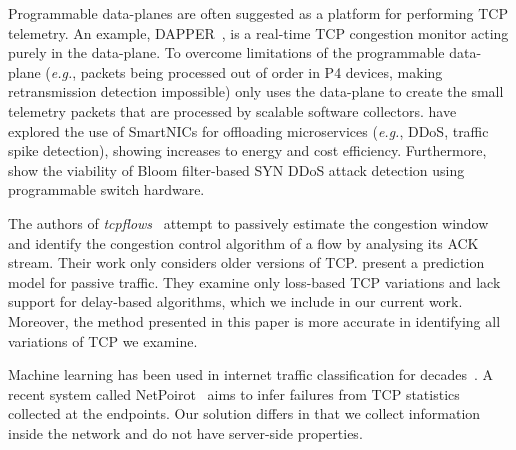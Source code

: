 
Programmable data-planes are often suggested as a platform for performing TCP telemetry. An example, DAPPER~\cite{DBLP:conf/sosr/GhasemiBR17}, is a real-time TCP congestion monitor acting purely in the data-plane. To overcome limitations of the programmable data-plane (\emph{e.g.}, packets being processed out of order in P4 devices, making retransmission detection impossible) \seidr{} only uses the data-plane to create the small telemetry packets that are processed by scalable software collectors.
\Textcite{DBLP:conf/usenix/LiuPKP19} have explored the use of SmartNICs for offloading microservices (\emph{e.g.}, DDoS, traffic spike detection), showing increases to energy and cost efficiency.
Furthermore, \textcite{DBLP:conf/sc/HillAG18} show the viability of Bloom filter-based SYN DDoS attack detection using programmable switch hardware.

The authors of \emph{tcpflows}~\cite{rewaskar2006passive} attempt to passively estimate the congestion window and identify the congestion control algorithm of a flow by analysing its ACK stream. Their work only considers older versions of TCP. \Textcite{DBLP:conf/icccn/HagosEYK18} present a prediction model for passive traffic. They examine only loss-based TCP variations and lack support for delay-based algorithms, which we include in our current work. Moreover, the method presented in this paper is more accurate in identifying all variations of TCP we examine.


Machine learning has been used in internet traffic classification for decades~\cite{nguyen2008survey}. A recent system called NetPoirot~\cite{arzani2016taking} aims to infer failures from TCP statistics collected at the endpoints. Our solution differs in that we collect information inside the network and do not have server-side properties.

